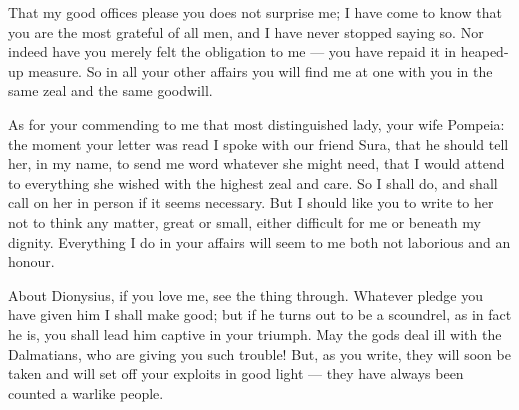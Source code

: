 

 That my good offices please you does not surprise me; I have come to know that you are the most grateful of all men, and I have never stopped saying so. Nor indeed have you merely felt the obligation to me --- you have repaid it in heaped-up measure. So in all your other affairs you will find me at one with you in the same zeal and the same goodwill.

 As for your commending to me that most distinguished lady, your wife Pompeia: the moment your letter was read I spoke with our friend Sura, that he should tell her, in my name, to send me word whatever she might need, that I would attend to everything she wished with the highest zeal and care. So I shall do, and shall call on her in person if it seems necessary. But I should like you to write to her not to think any matter, great or small, either difficult for me or beneath my dignity. Everything I do in your affairs will seem to me both not laborious and an honour.

 About Dionysius, if you love me, see the thing through. Whatever pledge you have given him I shall make good; but if he turns out to be a scoundrel, as in fact he is, you shall lead him captive in your triumph. May the gods deal ill with the Dalmatians, who are giving you such trouble! But, as you write, they will soon be taken and will set off your exploits in good light --- they have always been counted a warlike people.
